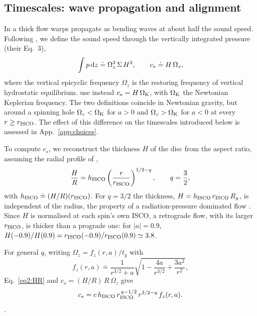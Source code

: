 \subsection{Timescales: wave propagation and alignment}
\label{sec2:timescales}

In a thick flow warps propagate as bending waves at about half the sound speed.
Following \citet{FoucartLai2014}, we define the sound speed through the vertically integrated pressure (their Eq.~3),
\begin{equation}
    \label{eq2:csdef}
    \int p\,\textup{d}z\doteq\Omega_z^2\,\Sigma\,H^2,
    \qquad
    c_s\doteq H\,\Omega_z ,
\end{equation}
where the vertical epicyclic frequency $\Omega_z$ is the restoring frequency of vertical hydrostatic equilibrium.
\citet{Motta2017} use instead $c_s=H\,\Omega_\textup{K}$, with $\Omega_\textup{K}$ the Newtonian Keplerian frequency.
The two definitions coincide in Newtonian gravity, but around a spinning hole $\Omega_z<\Omega_\textup{K}$ for $a>0$ and $\Omega_z>\Omega_\textup{K}$ for $a<0$ at every $r\geq r_\textup{ISCO}$.
The effect of this difference on the timescales introduced below is assessed in App.~\ref{app:choices}.

To compute $c_s$, we reconstruct the thickness $H$ of the disc from the aspect ratio, assuming the radial profile of \citet{Motta2017},
\begin{equation}
    \label{eq2:HR}
    \frac{H}{R}=h_\textup{ISCO}\left(\frac{r}{r_\textup{ISCO}}\right)^{1/2-q},
    \qquad q=\frac32 ,
\end{equation}
with $h_\textup{ISCO}\doteq(H/R)(r_\textup{ISCO})$.
For $q=3/2$ the thickness, $H=h_\textup{ISCO}\,r_\textup{ISCO}\,R_g$, is independent of the radius, the property of a radiation-pressure dominated flow \citep{accretion}.
Since $H$ is normalised at each spin's own ISCO, a retrograde flow, with its larger $r_\textup{ISCO}$, is thicker than a prograde one: for $|a|=0.9$, $H(-0.9)/H(0.9)=r_\textup{ISCO}(-0.9)/r_\textup{ISCO}(0.9)\simeq3.8$.

For general $q$, writing $\Omega_z=f_z(r,a)/t_g$ with
\begin{equation}
    f_z(r,a)\doteq\frac{1}{r^{3/2}+a}\sqrt{1-\frac{4a}{r^{3/2}}+\frac{3a^2}{r^2}},
\end{equation}
Eq.~\eqref{eq2:HR} and $c_s=(H/R)\,R\,\Omega_z$ give
\begin{equation}
    \label{eq2:cs}
    c_s=c\,h_\textup{ISCO}\,r_\textup{ISCO}^{\,q-1/2}\,r^{3/2-q}\,f_z(r,a).
\end{equation}.

